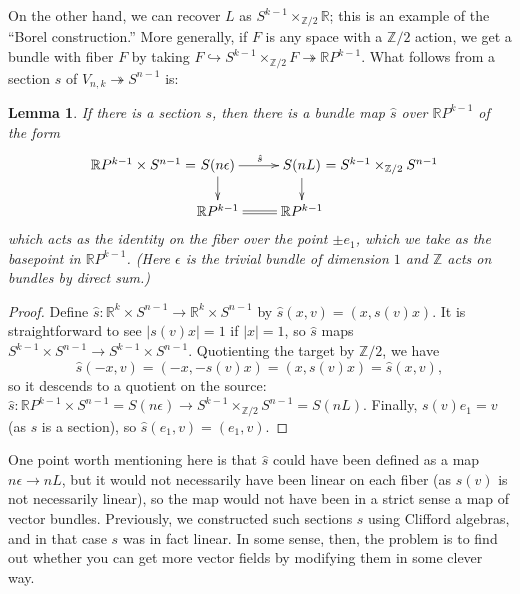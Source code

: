 \documentclass{article}
\newcommand{\Z}{\mathbb{Z}}
\newcommand{\R}{\mathbb{R}}
\newcommand{\RP}{\R P}
\newcommand{\into}{\hookrightarrow}
\newcommand{\onto}{\twoheadrightarrow}
\newtheorem{lem}[thm]{Lemma}
\begin{document}
On the other hand, we can recover $L$ as $S^{k-1} \times_{\Z/2} \R$; this is an example of the ``Borel construction.'' %
More generally, if $F$ is any space with a $\Z/2$ action, we get a bundle with fiber $F$ by taking $F \into S^{k-1} \times_{\Z/2} F \onto \RP^{k-1}$.  What follows from a section $s$ of $V_{n, k} \onto S^{n-1}$ is:
\begin{lem}
If there is a section $s$, then there is a bundle map $\hat s$ over $\RP^{k-1}$ of the form
\[\xymatrix@R=.6cm{
\makebox[0cm][r]{$\RP^{k-1} \times S^{n-1}=$\ }S(n \epsilon)\ar[r]^{\hat s}\ar[d]&
S(nL)\makebox[0cm][l]{\ $=S^{k-1} \times_{\Z/2} S^{n-1}$}\ar[d]\\
\RP^{k-1}\ar@{=}[r]&\RP^{k-1}
}\]
which acts as the identity on the fiber over the point $\pm e_1$, which we take as the basepoint in $\RP^{k-1}$.
(Here $\epsilon$ is the trivial bundle of dimension $1$ and $\Z$ acts on bundles by direct sum.)
\end{lem}
\begin{proof}
Define $\hat s: \R^k \times S^{n-1} \to \R^k \times S^{n-1}$ by $\hat s(x, v) = (x, s(v) x)$.  It is straightforward to see $|s(v) x| = 1$ if $|x| = 1$, so $\hat s$ maps $S^{k-1} \times S^{n-1} \to S^{k-1} \times S^{n-1}$.  Quotienting the target by $\Z/2$, we have \[\hat s(-x, v) = (-x, -s(v)x) = (x, s(v) x) = \hat{s}(x, v),\] so it descends to a quotient on the source: $\hat{s}: \RP^{k-1} \times S^{n-1} = S(n \epsilon) \to S^{k-1} \times_{\Z/2} S^{n-1} = S(nL)$.  Finally, $s(v)e_1 = v$ (as $s$ is a section), so $\hat{s}(e_1, v) = (e_1, v)$.
\end{proof}
One point worth mentioning here is that $\hat s$ could have been defined as a map $n \epsilon \to n L$, but it would not necessarily have been linear on each fiber (as $s(v)$ is not necessarily linear), so the map would not have been in a strict sense a map of vector bundles.  Previously, we constructed such sections $s$ using Clifford algebras, and in that case $s$ was in fact linear.  In some sense, then, the problem is to find out whether you can get more vector fields by modifying them in some clever way.
\end{document}
